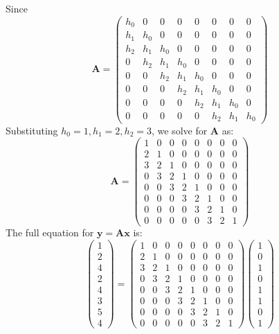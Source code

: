 \documentclass{article}
\newcommand{\0}{{\mathbf{0}}} %
\newcommand{\vect}[1]{\mathbf{#1}}
\begin{document}
Since
\[
\mathbf{A} =
\begin{pmatrix}
  h_0 & 0 & 0 & 0 & 0 & 0 & 0 & 0 \\
  h_1 & h_0 & 0 & 0 & 0 & 0 & 0 & 0 \\
  h_2 & h_1 & h_0 & 0 & 0 & 0 & 0 & 0 \\
  0 & h_2 & h_1 & h_0 & 0 & 0 & 0 & 0 \\
  0 & 0 & h_2 & h_1 & h_0 & 0 & 0 & 0 \\
  0 & 0 & 0 & h_2 & h_1 & h_0 & 0 & 0 \\
  0 & 0 & 0 & 0 & h_2 & h_1 & h_0 & 0 \\
  0 & 0 & 0 & 0 & 0 & h_2 & h_1 & h_0
\end{pmatrix}
\]
Substituting $h_0=1, h_1=2, h_2=3$, we solve for $\mathbf{A}$ as:
\[
\mathbf{A} =
\begin{pmatrix}
  1 & 0 & 0 & 0 & 0 & 0 & 0 & 0 \\
  2 & 1 & 0 & 0 & 0 & 0 & 0 & 0 \\
  3 & 2 & 1 & 0 & 0 & 0 & 0 & 0 \\
  0 & 3 & 2 & 1 & 0 & 0 & 0 & 0 \\
  0 & 0 & 3 & 2 & 1 & 0 & 0 & 0 \\
  0 & 0 & 0 & 3 & 2 & 1 & 0 & 0 \\
  0 & 0 & 0 & 0 & 3 & 2 & 1 & 0 \\
  0 & 0 & 0 & 0 & 0 & 3 & 2 & 1
\end{pmatrix}
\]
The full equation for $\vect{y} = \mathbf{A}\vect{x}$ is:
\[
\begin{pmatrix} 1 \\ 2 \\ 4 \\ 2 \\ 4 \\ 3 \\ 5 \\ 4
\end{pmatrix}
=
\begin{pmatrix}
  1 & 0 & 0 & 0 & 0 & 0 & 0 & 0 \\
  2 & 1 & 0 & 0 & 0 & 0 & 0 & 0 \\
  3 & 2 & 1 & 0 & 0 & 0 & 0 & 0 \\
  0 & 3 & 2 & 1 & 0 & 0 & 0 & 0 \\
  0 & 0 & 3 & 2 & 1 & 0 & 0 & 0 \\
  0 & 0 & 0 & 3 & 2 & 1 & 0 & 0 \\
  0 & 0 & 0 & 0 & 3 & 2 & 1 & 0 \\
  0 & 0 & 0 & 0 & 0 & 3 & 2 & 1
\end{pmatrix}
\begin{pmatrix} 1 \\ 0 \\ 1 \\ 0 \\ 1 \\ 1 \\ 0 \\ 1
\end{pmatrix}
\]
\end{document}
